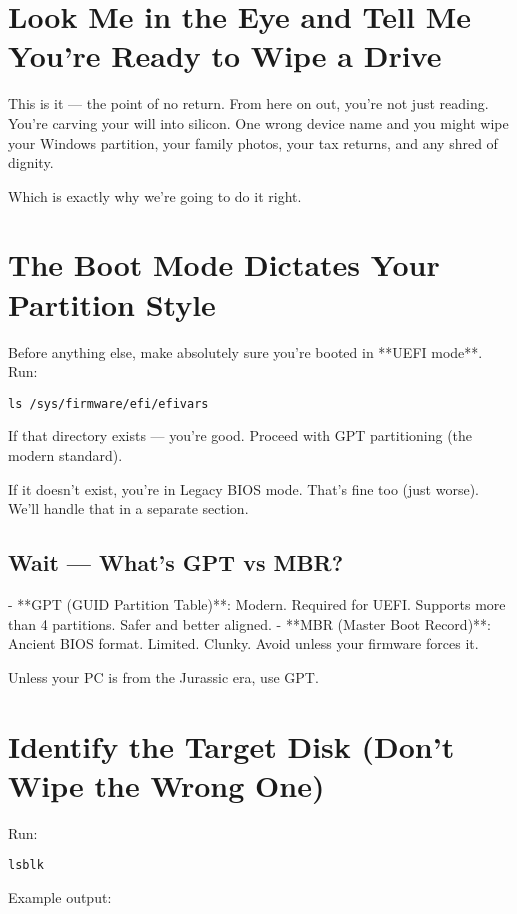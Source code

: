 \documentclass[12pt]{book}
\begin{document}
\section*{Look Me in the Eye and Tell Me You're Ready to Wipe a Drive}

This is it — the point of no return. From here on out, you’re not just reading. You’re carving your will into silicon. One wrong device name and you might wipe your Windows partition, your family photos, your tax returns, and any shred of dignity.

Which is exactly why we’re going to do it right.

\section{The Boot Mode Dictates Your Partition Style}

Before anything else, make absolutely sure you’re booted in **UEFI mode**. Run:

\begin{lstlisting}
ls /sys/firmware/efi/efivars
\end{lstlisting}

If that directory exists — you're good. Proceed with GPT partitioning (the modern standard).

If it doesn’t exist, you're in Legacy BIOS mode. That’s fine too (just worse). We’ll handle that in a separate section.

\subsection*{Wait — What’s GPT vs MBR?}

- **GPT (GUID Partition Table)**: Modern. Required for UEFI. Supports more than 4 partitions. Safer and better aligned.
- **MBR (Master Boot Record)**: Ancient BIOS format. Limited. Clunky. Avoid unless your firmware forces it.

Unless your PC is from the Jurassic era, use GPT.

\section{Identify the Target Disk (Don't Wipe the Wrong One)}

Run:

\begin{lstlisting}
lsblk
\end{lstlisting}

Example output:
\end{document}
